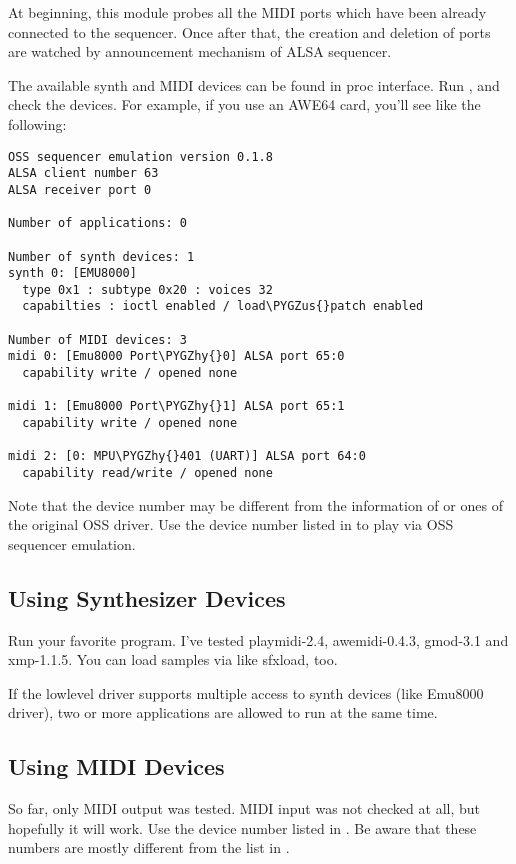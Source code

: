 \documentclass[a4paper,8pt,english]{sphinxmanual}
\def\PYGZus{\char`\_}
\def\PYGZhy{\char`\-}
\begin{document}
At beginning, this module probes all the MIDI ports which have been
already connected to the sequencer. Once after that, the creation and deletion
of ports are watched by announcement mechanism of ALSA sequencer.

The available synth and MIDI devices can be found in proc interface.
Run , and check the devices. For example,
if you use an AWE64 card, you'll see like the following:

\begin{Verbatim}[commandchars=\\\{\}]
OSS sequencer emulation version 0.1.8
ALSA client number 63
ALSA receiver port 0

Number of applications: 0

Number of synth devices: 1
synth 0: [EMU8000]
  type 0x1 : subtype 0x20 : voices 32
  capabilties : ioctl enabled / load\PYGZus{}patch enabled

Number of MIDI devices: 3
midi 0: [Emu8000 Port\PYGZhy{}0] ALSA port 65:0
  capability write / opened none

midi 1: [Emu8000 Port\PYGZhy{}1] ALSA port 65:1
  capability write / opened none

midi 2: [0: MPU\PYGZhy{}401 (UART)] ALSA port 64:0
  capability read/write / opened none
\end{Verbatim}

Note that the device number may be different from the information of
 or ones of the original OSS driver.
Use the device number listed in 
to play via OSS sequencer emulation.


\subsection{Using Synthesizer Devices}
\label{sound/designs/seq-oss:using-synthesizer-devices}
Run your favorite program. I've tested playmidi-2.4, awemidi-0.4.3, gmod-3.1
and xmp-1.1.5. You can load samples via  like sfxload,
too.

If the lowlevel driver supports multiple access to synth devices (like
Emu8000 driver), two or more applications are allowed to run at the same
time.


\subsection{Using MIDI Devices}
\label{sound/designs/seq-oss:using-midi-devices}
So far, only MIDI output was tested. MIDI input was not checked at all,
but hopefully it will work. Use the device number listed in
.
Be aware that these numbers are mostly different from the list in
.
\end{document}
